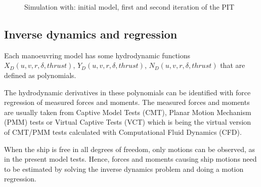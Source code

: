\documentclass[review]{elsarticle}
\begin{document}
\begin{figure}[H]
\centering
\capstart

\noindent{}
\caption{Simulation with: initial model, first and second iteration of the PIT}\label{\detokenize{01.01_method:iterations}}\end{figure}


\subsection{Inverse dynamics and regression}
\label{\detokenize{03.01_inverse_dynamics:inverse-dynamics-and-regression}}\label{\detokenize{03.01_inverse_dynamics::doc}}
\sphinxAtStartPar
Each manoeuvring model has some hydrodynamic functions \(X_D(u,v,r,\delta,thrust)\), \(Y_D(u,v,r,\delta,thrust)\), \(N_D(u,v,r,\delta,thrust)\) that are defined as polynomials.

\sphinxAtStartPar
The hydrodynamic derivatives in these polynomials can be identified with force regression of measured forces and moments. The measured forces and moments are usually taken from Captive Model Tests (CMT), Planar Motion Mechanism (PMM) tests or Virtual Captive Tests (VCT) which is being the virtual version of CMT/PMM tests calculated with Computational Fluid Dynamics (CFD).

\sphinxAtStartPar
When the ship is free in all degrees of freedom, only motions can be observed, as in the present model tests. Hence, forces and moments causing ship motions need to be estimated by solving the inverse dynamics problem and doing a motion regression.
\end{document}
